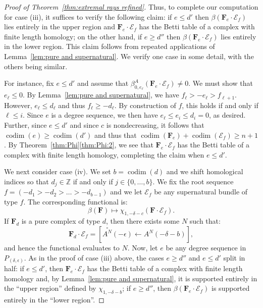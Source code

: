 \documentclass[12pt]{amsart}
\theoremstyle{definition}
\theoremstyle{remark}
\newcommand{\codim}{\operatorname{codim}}
\newcommand{\ZZ}{\mathbb{Z}}
\newcommand{\bb}{c}
\newcommand{\dd}{d}
\newcommand{\cE}{\mathcal{E}}
\newcommand{\FF}{\mathbf{F}}
\newcommand{\zp}{\circ}
\begin{document}
\begin{proof}[Proof of Theorem~\ref{thm:extremal rays refined}]
Thus, to complete our computation for case (iii), it suffices to verify the following claim: if $e\leq d'$ then $\beta(\FF_e\cdot \cE_f)$ lies entirely in the upper region and $\FF_e\cdot \cE_f$ has the Betti table of a complex with finite length homology; on the other hand, if $e\geq d''$ then $\beta(\FF_e\cdot \cE_f)$ lies entirely in the lower region.  This claim follows from repeated applications of Lemma~\ref{lem:pure and supernatural}.  We verify one case in some detail, with the others being similar.  

For instance, fix $e\leq d'$ and assume that $\beta_{0,e_\ell}^A(\FF_e\cdot \cE_f)\ne 0$.  We must show that $e_{\ell}\leq 0$.  By Lemma~\ref{lem:pure and supernatural}, we have
$
f_{\ell}>-e_{\ell}>f_{\ell+1}.
$
However, $e_{\ell}\leq d_{\ell}$ and thus $f_{\ell}\geq -d_{\ell}$.  By construction of $f$, this holds if and only if $\ell \leq i$.  Since $e$ is a degree sequence, we then have $e_{\ell}\leq e_i\leq d_i=0$, as desired.  Further, since $e\leq d'$ and since $\bb$ is nondecreasing, it follows that $\codim(e)\geq \codim(d')$ and thus that $\codim(\FF_e)+\codim(\cE_f)\geq n+1$.  By Theorem~\ref{thm:Phi}\eqref{thm:Phi:2}, we see that $\FF_e\cdot \cE_f$ has the Betti table of a complex with finite length homology, completing the claim when $e\leq d'$.  

We next consider case (iv).  We set $b=\codim(d)$ and we shift homological indices so that $d_j\in \ZZ$ if and only if $j\in \{0, \dots, b\}$.
We fix the root sequence $f=(-d_{1}>-d_{2}>\dots>-d_{b-1})$ and we let $\cE_f$ be any supernatural bundle of type $f$.   The corresponding functional is:
\[
\beta(\FF)\mapsto \chi_{1,-\delta-c}(\FF\cdot \cE_f).
\]
If $\FF_d$ is a pure complex of type $\dd$, then there exists some $N$ such that:
\[
\FF_d\cdot \cE_f=\left[ \overset{\zp}{A^N}(-\epsilon)\gets A^N(-\delta-b) \right],
\]
and hence the functional evaluates to $N$.  
Now, let $e$ be any degree sequence in $P_{(\delta,\epsilon)}$.  As in the proof of case (iii) above, the cases $e\geq d''$ and $e\leq d'$ split in half:
if $e\leq d'$, then $\FF_e\cdot \cE_f$ has the Betti table of a complex with finite length homology and, by Lemma~\ref{lem:pure and supernatural}, it is supported entirely in the ``upper region'' defined by $\chi_{1,-\delta-b}$; if $e\geq d''$, then $\beta(\FF_e\cdot \cE_f)$ is supported entirely in the ``lower region''.


\end{proof}
\end{document}
